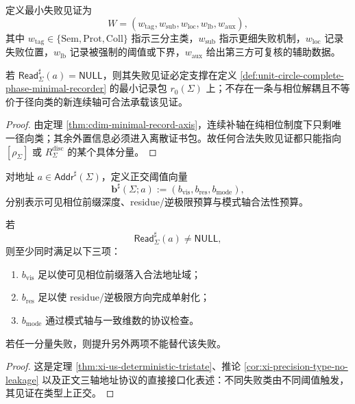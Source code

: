 \begin{definition}[失败见证包]\label{def:unit-circle-complete-phase-failure-witness}
定义最小失败见证为
\[
W=(w_{\mathrm{tag}},w_{\mathrm{sub}},w_{\mathrm{loc}},w_{\mathrm{lb}},w_{\mathrm{aux}}),
\]
其中 \(w_{\mathrm{tag}}\in\{\mathrm{Sem},\mathrm{Prot},\mathrm{Coll}\}\) 指示三分主类，\(w_{\mathrm{sub}}\) 指示更细失败机制，\(w_{\mathrm{loc}}\) 记录失败位置，\(w_{\mathrm{lb}}\) 记录被强制的阈值或下界，\(w_{\mathrm{aux}}\) 给出第三方可复核的辅助数据。
\end{definition}

\begin{proposition}[见证必须落在记录轴支撑上]\label{prop:unit-circle-complete-phase-witness-support}
若 \(\mathsf{Read}^{\sharp}_{\Sigma}(a)=\mathsf{NULL}\)，则其失败见证必定支撑在定义 \ref{def:unit-circle-complete-phase-minimal-recorder} 的最小记录包 \(r_0(\Sigma)\) 上；不存在一条与相位解耦且不等价于径向类的新连续轴可合法承载该见证。
\end{proposition}
\begin{proof}
由定理 \ref{thm:cdim-minimal-record-axis}，连续补轴在纯相位制度下只剩唯一径向类；其余外置信息必须进入离散证书包。故任何合法失败见证都只能指向 \([\rho_\Sigma]\) 或 \(R^{\mathrm{disc}}_\Sigma\) 的某个具体分量。
\end{proof}

\begin{definition}[正交阈值向量]\label{def:unit-circle-complete-phase-threshold-vector-sharp}
对地址 \(a\in\mathsf{Addr}^{\sharp}(\Sigma)\)，定义正交阈值向量
\[
\mathbf b^\sharp(\Sigma;a)
:=
(b_{\mathrm{vis}},b_{\mathrm{res}},b_{\mathrm{mode}}),
\]
分别表示可见相位前缀深度、residue/逆极限预算与模式轴合法性预算。
\end{definition}

\begin{proposition}[正交阈值的非替代性]\label{prop:unit-circle-complete-phase-threshold-orthogonality}
若
\[
\mathsf{Read}^{\sharp}_{\Sigma}(a)\neq\mathsf{NULL},
\]
则至少同时满足以下三项：
\begin{enumerate}
  \item \(b_{\mathrm{vis}}\) 足以使可见相位前缀落入合法地址域；
  \item \(b_{\mathrm{res}}\) 足以使 residue/逆极限方向完成单射化；
  \item \(b_{\mathrm{mode}}\) 通过模式轴与一致维数的协议检查。
\end{enumerate}
若任一分量失败，则提升另外两项不能替代该失败。
\end{proposition}
\begin{proof}
这是定理 \ref{thm:xi-us-deterministic-tristate}、推论 \ref{cor:xi-precision-type-no-leakage} 以及正文三轴地址协议的直接接口化表述：不同失败类由不同阈值触发，其见证在类型上正交。
\end{proof}

